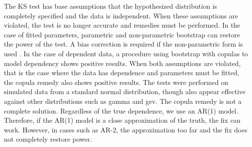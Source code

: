 \documentclass[12pt, letterpaper, titlepage]{article}
\begin{document}
The KS test has base assumptions that the hypothesized distribution is 
completely specified and the data is independent. When these assumptions are 
violated, the test is no longer accurate and remedies must be performed. In the 
case of fitted parameters, parametric and non-parametric bootstrap can restore 
the power of the test. A bias correction is required if the non-parametric form 
is used \citep{Babu}. In the case of dependent data, a procedure using bootstrap 
with copulas to model dependency shows positive results. When both assumptions 
are violated, that is the case where the data has dependence and parameters must 
be fitted, the copula remedy also shows positive results. The tests were 
performed on simulated data from a standard normal distribution, though also 
appear effective against other distributions such as gamma and gev. The copula 
remedy is not a complete solution. Regardless of the true dependence, we use an 
AR(1) model. Therefore, if the AR(1) model is a close approximation of the truth, 
the fix can work. However, in cases such as AR-2, the approximation too far and 
the fix does not completely restore power.




\end{document}
